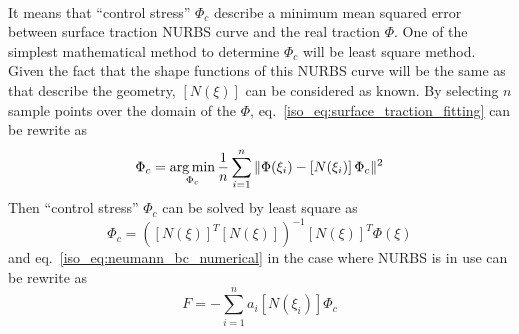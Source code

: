 \paragraph{}
It means that ``control stress'' $\Phi_c$ describe a minimum mean squared error between surface traction NURBS curve and the real
    traction $\Phi$.
One of the simplest mathematical method to determine $\Phi_c$ will be least square method.
Given the fact that the shape functions of this NURBS curve will be the same as that describe the geometry, $\left[ N(\xi) \right]$
    can be considered as known.
By selecting $n$ sample points over the domain of the $\Phi$, eq.~\ref{iso_eq:surface_traction_fitting} can be rewrite as
    \begin{equation}
        \Phi_c = \operatorname*{arg\,min}_{\Phi_c}
            \frac{1}{n}
            \sum_{i=1}^n
            \|
                \Phi(\xi_i)-
                    \left[ N(\xi_i) \right]
                    \Phi_c
            \|^2
    \label{iso_eq:surface_traction_fitting_discrete}
    \end{equation}
Then ``control stress'' $\Phi_c$ can be solved by least square as
    \begin{equation}
        \Phi_c= \left(
            \left[ N(\xi) \right] ^T
            \left[ N(\xi) \right]
        \right)^{-1}
        \left[ N(\xi) \right]^T
        \Phi(\xi)
    \end{equation}
and eq.~\ref{iso_eq:neumann_bc_numerical} in the case where NURBS is in use can be rewrite as
    \begin{equation}
        {F}=-\sum_{i=1}^n
        a_i
        [N(\xi_i)]
        \Phi_c
    \label{iso_eq:neumann_bc_numerical_NURBS}
    \end{equation}
\pagebreak